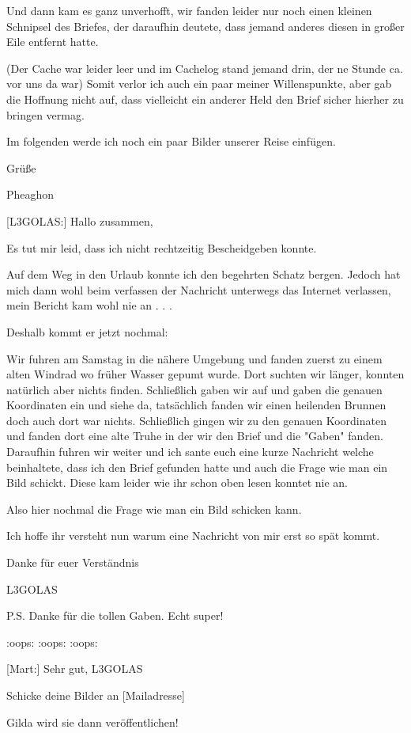 \documentclass[10pt, a4paper, oneside]{book}
\begin{document}
\begin{multicols}{2}
Und dann kam es ganz unverhofft, wir fanden leider nur noch einen kleinen Schnipsel des Briefes, der daraufhin deutete, dass jemand anderes diesen in großer Eile entfernt hatte.

(Der Cache war leider leer und im Cachelog stand jemand drin, der ne Stunde ca. vor uns da war) Somit verlor ich auch ein paar meiner Willenspunkte, aber gab die Hoffnung nicht auf, dass vielleicht ein anderer Held den Brief sicher hierher zu bringen vermag.

Im folgenden werde ich noch ein paar Bilder unserer Reise einfügen.

Grüße

Pheaghon


[L3GOLAS:] Hallo zusammen,

Es tut mir leid, dass ich nicht rechtzeitig Bescheidgeben konnte.

Auf dem Weg in den Urlaub konnte ich den begehrten Schatz bergen. Jedoch hat mich dann wohl beim verfassen der Nachricht unterwegs das Internet verlassen, mein Bericht kam wohl nie an . . .

Deshalb kommt er jetzt nochmal:

Wir fuhren am Samstag in die nähere Umgebung und fanden zuerst zu einem alten Windrad wo früher Wasser gepumt wurde. Dort suchten wir länger, konnten natürlich aber nichts finden. Schließlich gaben wir auf und gaben die genauen Koordinaten ein und siehe da, tatsächlich fanden wir einen heilenden Brunnen doch auch dort war nichts. Schließlich gingen wir zu den genauen Koordinaten und fanden dort eine alte Truhe in der wir den Brief und die "Gaben" fanden. Daraufhin fuhren wir weiter und ich sante euch eine kurze Nachricht welche beinhaltete, dass ich den Brief gefunden hatte und auch die Frage wie man ein Bild schickt. Diese kam leider wie ihr schon oben lesen konntet nie an.

Also hier nochmal die Frage wie man ein Bild schicken kann.

Ich hoffe ihr versteht nun warum eine Nachricht von mir erst so spät kommt.

Danke für euer Verständnis

L3GOLAS

P.S. Danke für die tollen Gaben. Echt super!

:oops: :oops: :oops:

[Mart:] Sehr gut, L3GOLAS

Schicke deine Bilder an [Mailadresse]

Gilda wird sie dann veröffentlichen!


\end{multicols}
\end{document}
